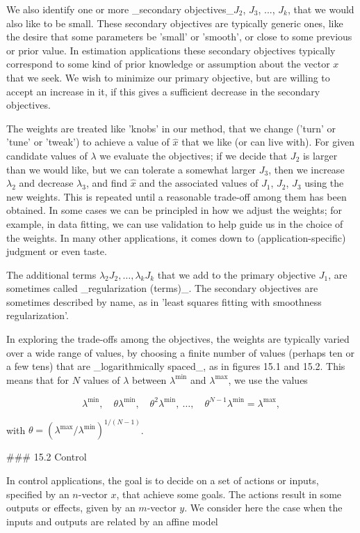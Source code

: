 We also identify one or more _secondary objectives_\(J_{2}\), \(J_{3}\), ..., \(J_{k}\), that we would also like to be small. These secondary objectives are typically generic ones, like the desire that some parameters be 'small' or 'smooth', or close to some previous or prior value. In estimation applications these secondary objectives typically correspond to some kind of prior knowledge or assumption about the vector \(x\) that we seek. We wish to minimize our primary objective, but are willing to accept an increase in it, if this gives a sufficient decrease in the secondary objectives.

The weights are treated like 'knobs' in our method, that we change ('turn' or 'tune' or 'tweak') to achieve a value of \(\hat{x}\) that we like (or can live with). For given candidate values of \(\lambda\) we evaluate the objectives; if we decide that \(J_{2}\) is larger than we would like, but we can tolerate a somewhat larger \(J_{3}\), then we increase \(\lambda_{2}\) and decrease \(\lambda_{3}\), and find \(\hat{x}\) and the associated values of \(J_{1}\), \(J_{2}\), \(J_{3}\) using the new weights. This is repeated until a reasonable trade-off among them has been obtained. In some cases we can be principled in how we adjust the weights; for example, in data fitting, we can use validation to help guide us in the choice of the weights. In many other applications, it comes down to (application-specific) judgment or even taste.

The additional terms \(\lambda_{2}J_{2},\ldots,\lambda_{k}J_{k}\) that we add to the primary objective \(J_{1}\), are sometimes called _regularization (terms)_. The secondary objectives are sometimes described by name, as in 'least squares fitting with smoothness regularization'.

In exploring the trade-offs among the objectives, the weights are typically varied over a wide range of values, by choosing a finite number of values (perhaps ten or a few tens) that are _logarithmically spaced_, as in figures 15.1 and 15.2. This means that for \(N\) values of \(\lambda\) between \(\lambda^{\min}\) and \(\lambda^{\max}\), we use the values

\[\lambda^{\min},\quad\theta\lambda^{\min},\quad\theta^{2}\lambda^{\min},\ \ldots,\quad\theta^{N-1}\lambda^{\min}=\lambda^{\max},\]

with \(\theta=(\lambda^{\max}/\lambda^{\min})^{1/(N-1)}\).

### 15.2 Control

In control applications, the goal is to decide on a set of actions or inputs, specified by an \(n\)-vector \(x\), that achieve some goals. The actions result in some outputs or effects, given by an \(m\)-vector \(y\). We consider here the case when the inputs and outputs are related by an affine model

